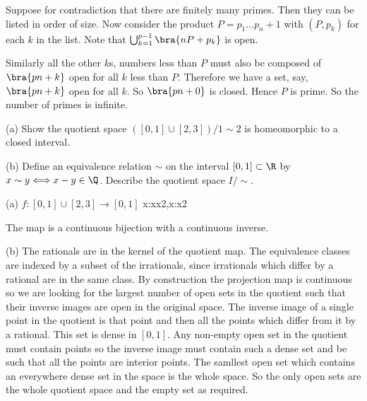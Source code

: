 \begin{solution}[\bf Solution.]
Suppose for contradiction that there are finitely many primes. Then they can be listed in order of size. Now consider the product $P = p_1\dots p_n + 1$ with $(P,p_k)$ for each $k$ in the list. Note that $\bigcup_{k=1}^{p-1}\bra{nP + p_k}$ is open.

Similarly all the other $k$s, numbers less than $P$ must also be composed of $\bra{pn + k}$ open for all $k$ less than $P$. Therefore we have a set, say, $\bra{pn + k}$ open for all $k$. So $\bra{pn + 0}$ is closed. Hence $P$ is prime. So the number of primes is infinite.

\een
\end{solution}


\begin{problem}
\ben
\item [(a)] Show the quotient space $([0, 1] \cup [2, 3])/1 \sim 2$ is homeomorphic to a closed interval.
\item [(b)] Define an equivalence relation $\sim$ on the interval $[0,1] \subset \R$ by $x \sim y \Longleftrightarrow x - y \in \Q$. Describe the quotient space $I/ \sim$.
\een
\end{problem}

\begin{solution}[\bf Solution.]
\ben
\item [(a)] $f:[0,1]\cup [2,3] \to [0,1]$
\be
x\in [0,1]:x\mapsto \frac x2,\qquad x\in [2,3]:x\mapsto {}2
\ee

The map is a continuous bijection with a continuous inverse.

\item [(b)] The rationals are in the kernel of the quotient map. The equivalence classes are indexed by a subset of the irrationals, since irrationals which differ by a rational are in the same class. By construction the projection map is continuous so we are looking for the largest number of open sets in the quotient such that their inverse images are open in the original space. The inverse image of a single point in the quotient is that point and then all the points which differ from it by a rational. This set is dense in $[0,1]$. Any non-empty open set in the quotient must contain points so the inverse image must contain such a dense set and be such that all the points are interior points. The samllest open set which contains an everywhere dense set in the space is the whole space. So the only open sets are the whole quotient space and the empty set as required.
\een
\end{solution}


